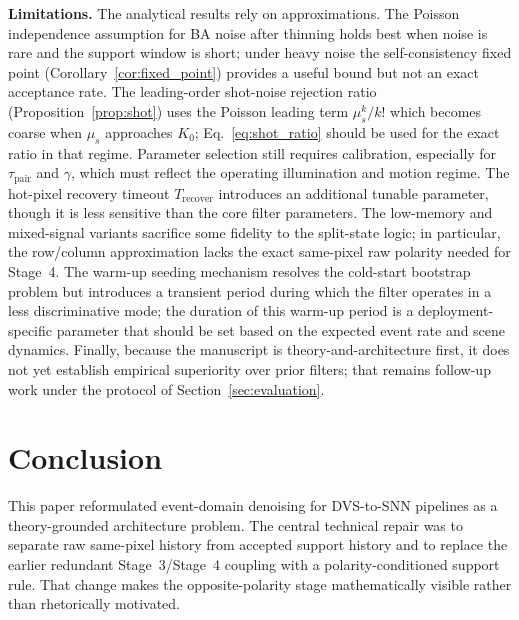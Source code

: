 \documentclass[a4paper,fleqn]{cas-dc}
\begin{document}
\textbf{Limitations.}
The analytical results rely on approximations. The Poisson independence assumption for BA noise after thinning holds best when noise is rare and the support window is short; under heavy noise the self-consistency fixed point (Corollary~\ref{cor:fixed_point}) provides a useful bound but not an exact acceptance rate. The leading-order shot-noise rejection ratio (Proposition~\ref{prop:shot}) uses the Poisson leading term $\mu_s^{k}/k!$ which becomes coarse when $\mu_s$ approaches $K_0$; Eq.~\eqref{eq:shot_ratio} should be used for the exact ratio in that regime. Parameter selection still requires calibration, especially for $\tau_{\text{pair}}$ and $\gamma$, which must reflect the operating illumination and motion regime. The hot-pixel recovery timeout $T_{\text{recover}}$ introduces an additional tunable parameter, though it is less sensitive than the core filter parameters. The low-memory and mixed-signal variants sacrifice some fidelity to the split-state logic; in particular, the row/column approximation lacks the exact same-pixel raw polarity needed for Stage~4. The warm-up seeding mechanism resolves the cold-start bootstrap problem but introduces a transient period during which the filter operates in a less discriminative mode; the duration of this warm-up period is a deployment-specific parameter that should be set based on the expected event rate and scene dynamics. Finally, because the manuscript is theory-and-architecture first, it does not yet establish empirical superiority over prior filters; that remains follow-up work under the protocol of Section~\ref{sec:evaluation}.

\section{Conclusion}
\label{sec:conclusion}

This paper reformulated event-domain denoising for DVS-to-SNN pipelines as a theory-grounded architecture problem. The central technical repair was to separate raw same-pixel history from accepted support history and to replace the earlier redundant Stage~3/Stage~4 coupling with a polarity-conditioned support rule. That change makes the opposite-polarity stage mathematically visible rather than rhetorically motivated.
\end{document}
